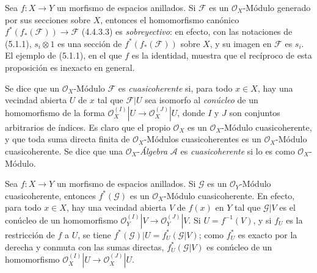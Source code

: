 \begin{env}[5.1.2]
\label{0.5.1.2-fr}
Sea $f:X\to Y$ un morfismo de espacios anillados. Si $\mathcal{F}$ es un
$\mathcal{O}_X$-Módulo generado por sus secciones sobre $X$, entonces
el homomorfismo canónico
$f^*(f_*(\mathcal{F}))\to\mathcal{F}$ (4.4.3.3) es \emph{sobreyectivo}: en
efecto, con las notaciones de (5.1.1), $s_i\otimes1$ es una sección de
$f^*(f_*(\mathcal{F}))$ sobre $X$, y su imagen en $\mathcal{F}$ es
$s_i$. El ejemplo de (5.1.1), en el que $f$ es la identidad, muestra que el recíproco de
esta proposición es inexacto en general.
\end{env}

\begin{env}[5.1.3]
\label{0.5.1.3-fr}
Se dice que un $\mathcal{O}_X$-Módulo $\mathcal{F}$ es \emph{cuasicoherente}
si, para todo $x\in X$, hay una vecindad abierta $U$ de $x$ tal que
$\mathcal{F}|U$ sea isomorfo al \emph{conúcleo} de un homomorfismo de la
forma
$\mathcal{O}_X^{(I)}|U\to\mathcal{O}_X^{(J)}|U$, donde $I$ y $J$ son
conjuntos arbitrarios de índices. Es claro que el propio $\mathcal{O}_X$ es
un $\mathcal{O}_X$-Módulo cuasicoherente, y que toda suma directa finita de
$\mathcal{O}_X$-Módulos cuasicoherentes es un $\mathcal{O}_X$-Módulo
cuasicoherente. Se dice que una $\mathcal{O}_X$-\emph{Álgebra} $\mathcal{A}$ es
\emph{cuasicoherente} si lo es como $\mathcal{O}_X$-Módulo.
\end{env}

\begin{env}[5.1.4]
\label{0.5.1.4-fr}
Sea $f:X\to Y$ un morfismo de espacios anillados. Si $\mathcal{G}$ es un
$\mathcal{O}_Y$-Módulo cuasicoherente, entonces $f^*(\mathcal{G})$ es un
$\mathcal{O}_X$-Módulo cuasicoherente. En efecto, para todo $x\in X$, hay
una vecindad abierta $V$ de $f(x)$ en $Y$ tal que $\mathcal{G}|V$ es el
conúcleo de un homomorfismo
$\mathcal{O}_Y^{(I)}|V\to\mathcal{O}_Y^{(J)}|V$. Si $U=f^{-1}(V)$, y si
$f_U$ es la restricción de $f$ a $U$, se tiene
$f^*(\mathcal{G})|U=f_U^*(\mathcal{G}|V)$; como $f_U^*$ es exacto por la derecha
y conmuta con las sumas directas, $f_U^*(\mathcal{G}|V)$ es conúcleo de un
homomorfismo
$\mathcal{O}_X^{(I)}|U\to\mathcal{O}_X^{(J)}|U$.
\end{env}

